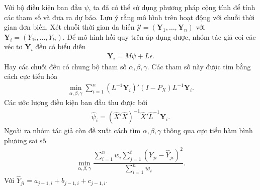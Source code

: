     Với bộ điều kiện ban đầu $\psi$, ta đã có thể sử dụng phương pháp cộng tính để tính các tham số và đưa ra dự báo. Lưu ý rằng mô hình trên hoạt động với chuỗi thời gian đơn biến. Xét chuỗi thời gian đa biến $\mathcal{Y} = \left(\textbf{Y}_1, \dots, \textbf{Y}_n\right) $ với $\textbf{Y}_i = \left(Y_{1i}, \dots, Y_{ti}\right)$. Để mô hình hồi quy trên áp dụng được, nhóm tác giả coi các véc tơ $\textbf{Y}_i$ đều có biểu diễn
    \begin{align}
        \textbf{Y}_i = M \psi + L \epsilon.  
    \end{align}
    Hay các chuỗi đều có chung bộ tham số $\alpha, \beta, \gamma$. Các tham số này được tìm bằng cách cực tiểu hóa
    \begin{align}
        \min_{\alpha, \beta, \gamma} \sum_{i=1}^n \left(L^{-1} \textbf{Y}_i\right)' \left(I - P_X\right) L^{-1} \textbf{Y}_i.        
    \end{align}
    Các ước lượng điều kiện ban đầu thu được bởi
    \begin{align}
        \hat{\psi}_i = \left(\hat{X}'\hat{X}\right)^{-1} \hat{X}'\hat{L}^{-1} \textbf{Y}_i.        
    \end{align}
    Ngoài ra nhóm tác giả còn đề xuất cách tìm $\alpha, \beta, \gamma$ thông qua cực tiểu hàm bình phương sai số
    \begin{align}
        \min_{\alpha, \beta,\gamma} \dfrac{\sum_{i=1}^n w_i \sum_{j=1}^t \left(Y_{ji} - \hat{Y}_{ji}\right)^2}{\sum_{i=1}^n w_i}.
    \end{align}
    Với $\hat{Y}_{ji} = a_{j-1, i} + b_{j-1,i} + c_{j-1,i}$.
